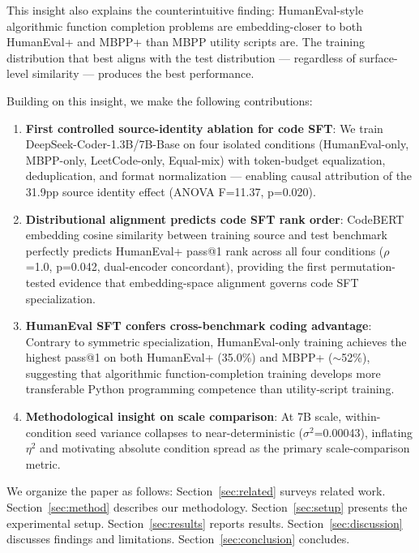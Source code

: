 This insight also explains the counterintuitive finding: HumanEval-style algorithmic function
completion problems are embedding-closer to both HumanEval+ and MBPP+ than MBPP utility
scripts are. The training distribution that best aligns with the test distribution ---
regardless of surface-level similarity --- produces the best performance.

Building on this insight, we make the following contributions:

\begin{enumerate}
\item \textbf{First controlled source-identity ablation for code SFT}: We train DeepSeek-Coder-1.3B/7B-Base
  on four isolated conditions (HumanEval-only, MBPP-only, LeetCode-only, Equal-mix) with
  token-budget equalization, deduplication, and format normalization --- enabling causal
  attribution of the 31.9pp source identity effect (ANOVA F=11.37, p=0.020).

\item \textbf{Distributional alignment predicts code SFT rank order}: CodeBERT embedding cosine
  similarity between training source and test benchmark perfectly predicts HumanEval+ pass@1
  rank across all four conditions ($\rho$=1.0, p=0.042, dual-encoder concordant), providing the
  first permutation-tested evidence that embedding-space alignment governs code SFT
  specialization.

\item \textbf{HumanEval SFT confers cross-benchmark coding advantage}: Contrary to symmetric
  specialization, HumanEval-only training achieves the highest pass@1 on both HumanEval+
  (35.0\%) and MBPP+ ($\sim$52\%), suggesting that algorithmic function-completion training develops
  more transferable Python programming competence than utility-script training.

\item \textbf{Methodological insight on scale comparison}: At 7B scale, within-condition seed variance
  collapses to near-deterministic ($\sigma^2$=0.00043), inflating $\eta^2$ and motivating absolute
  condition spread as the primary scale-comparison metric.
\end{enumerate}

We organize the paper as follows: Section~\ref{sec:related} surveys related work.
Section~\ref{sec:method} describes our methodology.
Section~\ref{sec:setup} presents the experimental setup.
Section~\ref{sec:results} reports results.
Section~\ref{sec:discussion} discusses findings and limitations.
Section~\ref{sec:conclusion} concludes.
